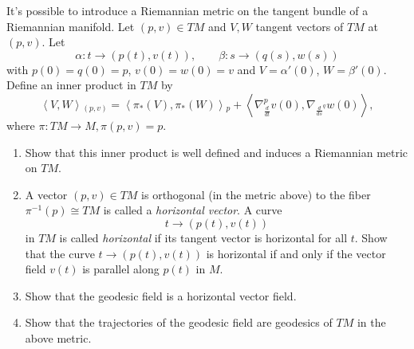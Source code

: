 \documentclass{book}
\begin{document}
\begin{exercise}
\label{exercise-geodesics-tangent-bundle}
It's possible to introduce a Riemannian
metric on the tangent bundle
of a Riemannian manifold. Let $(p,v) \in TM$
and $V,W$ tangent vectors
of $TM$ at $(p,v)$. Let
$$
\alpha:t \to (p(t),v(t)),\qquad  \beta:s \to
(q(s),w(s))
$$
with $p(0)=q(0)=p$, $v(0)=w(0)=v$
and $V=\alpha'(0)$, $W=\beta'(0)$.
Define an inner product in $TM$ by
\begin{equation}
\label{equation-tangent-bundle-metric}
\left\langle{}V,W\right\rangle{}_{(p,v)}
=\left\langle{}\pi_*(V),\pi_*(W)\right\rangle{}_p
+\left\langle{}\nabla^p_{\frac{d}{dt}}v(0),
\nabla_{\frac{d}{ds}^q}w(0)\right\rangle{},
\end{equation}
where $\pi:TM \to M, \pi(p,v)=p$.

\begin{enumerate}
\item Show that this inner product is well
defined
and induces a Riemannian metric on $TM$.

\item A vector $(p,v) \in TM$ is orthogonal
(in the metric above) to the fiber
$\pi^{-1}(p) \cong TM$
is called a {\it horizontal vector}. A curve
$$
t \to (p(t),v(t))
$$
in $TM$ is called {\it horizontal} if its
tangent vector is
horizontal for all $t$.
Show that the curve $t \to (p(t),v(t))$
is horizontal if and only if the vector field
$v(t)$
is parallel along $p(t)$ in $M$.

\item Show that the geodesic field is a
horizontal vector field.

\item Show that the trajectories of the
geodesic field
are geodesics of $TM$ in the above metric.
\end{enumerate}
\end{exercise}
\end{document}
